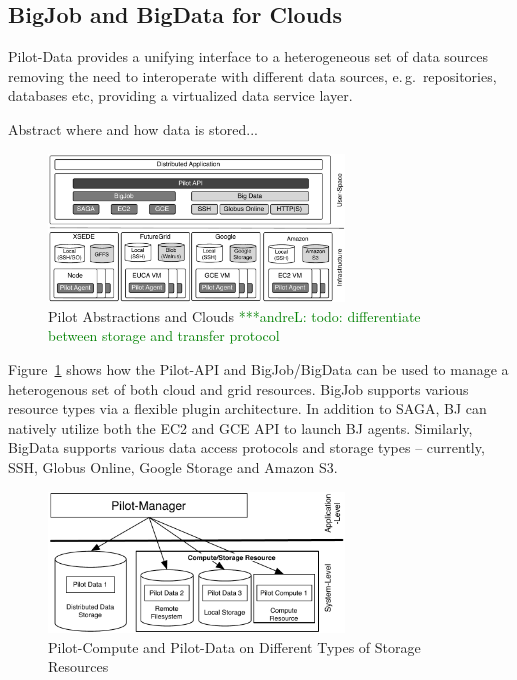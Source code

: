 \documentclass[times]{cpeauth}
\newcommand{\alnote}[1]{ {\textcolor{green} { ***andreL: #1 }}}
\newcommand{\alnote}[1]{}
\begin{document}
\subsection{BigJob and BigData for Clouds}

Pilot-Data provides a unifying interface to a heterogeneous set of data 
sources removing the need to interoperate with different data sources, e.\,g.\ 
repositories, databases etc, providing a virtualized data service layer.

Abstract where and how data is stored...



\begin{figure}[t]
	\centering
		\includegraphics[width=0.7\textwidth]{figures/cloud_pilot_job.pdf}
	\caption{Pilot Abstractions and Clouds\alnote{todo: differentiate between 
	storage and transfer protocol}}
	\label{fig:figures_cloud_pilot_job}
\end{figure}

Figure~\ref{fig:figures_cloud_pilot_job} shows how the Pilot-API and 
BigJob/BigData can be used to manage a heterogenous set of both cloud and grid 
resources. BigJob supports various resource types via a flexible plugin 
architecture. In addition to SAGA, BJ can natively utilize both the EC2 and 
GCE API to launch BJ agents. Similarly, BigData supports various data access
protocols and storage types -- currently, SSH, Globus Online, Google Storage
and Amazon S3.



\begin{figure}[t]
	\centering
		\includegraphics[width=0.7\textwidth]{figures/storage-types.pdf}
	\caption{Pilot-Compute and Pilot-Data on Different Types of Storage Resources}
	\label{fig:figures_storage-types}
\end{figure}
\end{document}
